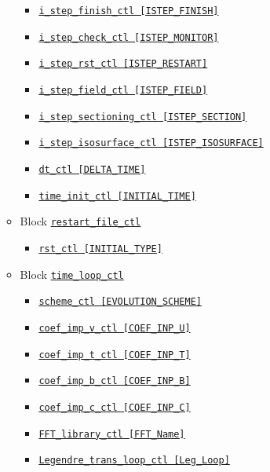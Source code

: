 \begin{itemize}
\begin{itemize}
\begin{itemize}
		\item \hyperref[href_t:i_step_finish_ctl]
			{\tt i\_step\_finish\_ctl      [ISTEP\_FINISH]}
		\item \hyperref[href_t:i_step_check_ctl]
			{\tt i\_step\_check\_ctl       [ISTEP\_MONITOR]}
		\item \hyperref[href_t:i_step_rst_ctl]
			{\tt i\_step\_rst\_ctl         [ISTEP\_RESTART]}
		\item \hyperref[href_t:i_step_field_ctl]
			{\tt i\_step\_field\_ctl       [ISTEP\_FIELD]}
		\item \hyperref[href_t:i_step_sectioning_ctl]
			{\tt i\_step\_sectioning\_ctl  [ISTEP\_SECTION]}
		\item \hyperref[href_t:i_step_isosurface_ctl]
			{\tt i\_step\_isosurface\_ctl  [ISTEP\_ISOSURFACE]}
		\item \hyperref[href_t:dt_ctl]
			{\tt dt\_ctl                   [DELTA\_TIME]}
		\item \hyperref[href_t:time_init_ctl]
			{\tt time\_init\_ctl           [INITIAL\_TIME]}
		\end{itemize}
%
	\item Block \hyperref[href_t:restart_file_ctl]{\tt restart\_file\_ctl}
		\begin{itemize} \label{href_i:restart_file_ctl}
		\item \hyperref[href_t:rst_ctl]{\tt rst\_ctl      [INITIAL\_TYPE]}
		\end{itemize}
%
	\item Block \verb||
    		\hyperref[href_t:time_loop_ctl]{\tt time\_loop\_ctl}
		\begin{itemize} \label{href_i:time_loop_ctl}
		\item \hyperref[href_t:scheme_ctl]{\tt scheme\_ctl              [EVOLUTION\_SCHEME]}
		\item \hyperref[href_t:coef_imp_v_ctl]{\tt coef\_imp\_v\_ctl    [COEF\_INP\_U]}
		\item \hyperref[href_t:coef_imp_t_ctl]{\tt coef\_imp\_t\_ctl    [COEF\_INP\_T]}
		\item \hyperref[href_t:coef_imp_b_ctl]{\tt coef\_imp\_b\_ctl    [COEF\_INP\_B]}
		\item \hyperref[href_t:coef_imp_c_ctl]{\tt coef\_imp\_c\_ctl    [COEF\_INP\_C]}
		\item \hyperref[href_t:FFT_library_ctl]{\tt FFT\_library\_ctl   [FFT\_Name]}
		\item \hyperref[href_t:Legendre_trans_loop_ctl]
			{\tt Legendre\_trans\_loop\_ctl [Leg\_Loop]}
		\end{itemize}

\end{itemize}
\end{itemize}
